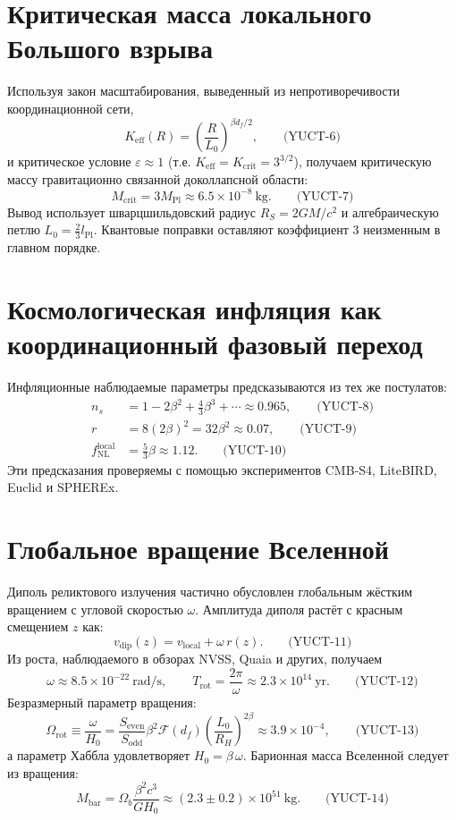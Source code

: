 \documentclass[12pt,a4paper]{article}
\newcommand{\Keff}{K_{\mathrm{eff}}}
\newcommand{\betaf}{\beta}
\newcommand{\Lpl}{l_{\mathrm{Pl}}}
\newcommand{\Sodd}{S_{\mathrm{odd}}}
\newcommand{\Seven}{S_{\mathrm{even}}}
\newcommand{\Lzero}{L_0}
\newcommand{\Omegarot}{\Omega_{\mathrm{rot}}}
\newcommand{\Mbar}{M_{\mathrm{bar}}}
\begin{document}
	\section{Критическая масса локального Большого взрыва}
	
	Используя закон масштабирования, выведенный из непротиворечивости координационной сети,
	\[
	\Keff(R) = \left(\frac{R}{\Lzero}\right)^{\betaf d_f/2}, \qquad\text{(YUCT-6)}
	\]
	и критическое условие \(\varepsilon \approx 1\) (т.е. \(\Keff = K_{\mathrm{crit}} = 3^{3/2}\)), получаем критическую массу гравитационно связанной доколлапсной области:
	\[
	M_{\mathrm{crit}} = 3 M_{\mathrm{Pl}} \approx 6.5\times 10^{-8}\ \mathrm{kg}. \qquad\text{(YUCT-7)}
	\]
	Вывод использует шварцшильдовский радиус \(R_S = 2GM/c^2\) и алгебраическую петлю \(\Lzero = \frac{2}{3}\Lpl\). Квантовые поправки оставляют коэффициент 3 неизменным в главном порядке.
	
	\section{Космологическая инфляция как координационный фазовый переход}
	
	Инфляционные наблюдаемые параметры предсказываются из тех же постулатов:
	\begin{align}
		n_s &= 1 - 2\betaf^2 + \frac{4}{3}\betaf^3 + \cdots \approx 0.965, \qquad\text{(YUCT-8)}\\
		r &= 8(2\betaf)^2 = 32\betaf^2 \approx 0.07, \qquad\text{(YUCT-9)}\\
		f_{\mathrm{NL}}^{\mathrm{local}} &= \frac{5}{3}\betaf \approx 1.12. \qquad\text{(YUCT-10)}
	\end{align}
	Эти предсказания проверяемы с помощью экспериментов CMB‑S4, LiteBIRD, Euclid и SPHEREx.
	
	\section{Глобальное вращение Вселенной}
	
	Диполь реликтового излучения частично обусловлен глобальным жёстким вращением с угловой скоростью \(\omega\). Амплитуда диполя растёт с красным смещением \(z\) как:
	\[
	v_{\mathrm{dip}}(z) = v_{\mathrm{local}} + \omega\, r(z). \qquad\text{(YUCT-11)}
	\]
	Из роста, наблюдаемого в обзорах NVSS, Quaia и других, получаем
	\[
	\omega \approx 8.5\times 10^{-22}\ \mathrm{rad/s},\qquad
	T_{\mathrm{rot}} = \frac{2\pi}{\omega} \approx 2.3\times 10^{14}\ \mathrm{yr}. \qquad\text{(YUCT-12)}
	\]
	Безразмерный параметр вращения:
	\[
	\Omegarot \equiv \frac{\omega}{H_0} = \frac{\Seven}{\Sodd} \betaf^2 \mathcal{F}(d_f)\left(\frac{L_0}{R_H}\right)^{2\betaf} \approx 3.9\times 10^{-4}, \qquad\text{(YUCT-13)}
	\]
	а параметр Хаббла удовлетворяет \(H_0 = \betaf\,\omega\). Барионная масса Вселенной следует из вращения:
	\[
	\Mbar = \Omega_b\frac{\betaf^2 c^3}{G H_0} \approx (2.3\pm 0.2)\times 10^{51}\ \mathrm{kg}. \qquad\text{(YUCT-14)}
	\]
	
\end{document}
